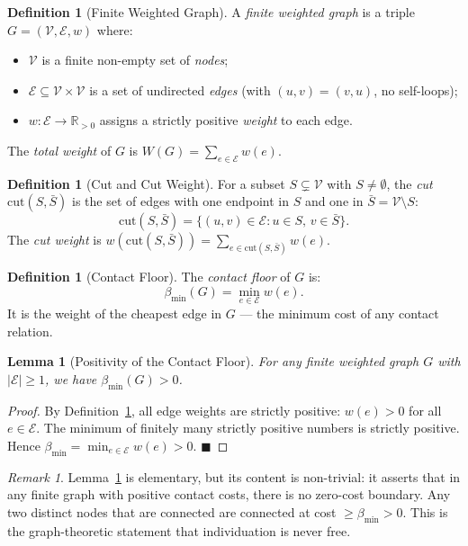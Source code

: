 \documentclass[12pt, a4paper]{article}
\theoremstyle{plain}
\newtheorem{lemma}[theorem]{Lemma}
\theoremstyle{definition}
\newtheorem{definition}[theorem]{Definition}
\theoremstyle{remark}
\newtheorem{remark}[theorem]{Remark}
\newcommand{\cut}{\mathrm{cut}}
\newcommand{\reals}{\mathbb{R}}
\newcommand{\Ecal}{\mathcal{E}}
\newcommand{\Vcal}{\mathcal{V}}
\newcommand{\bmin}{\beta_{\min}}
\newcommand{\qed}{\hfill$\blacksquare$}
\begin{document}
\begin{definition}[Finite Weighted Graph]
\label{def:fwg}
A \emph{finite weighted graph} is a triple $G = (\Vcal, \Ecal, w)$ where:
\begin{itemize}
  \item $\Vcal$ is a finite non-empty set of \emph{nodes};
  \item $\Ecal \subseteq \Vcal \times \Vcal$ is a set of undirected
  \emph{edges} (with $(u,v) = (v,u)$, no self-loops);
  \item $w: \Ecal \to \reals_{> 0}$ assigns a strictly positive \emph{weight}
  to each edge.
\end{itemize}
The \emph{total weight} of $G$ is $W(G) = \sum_{e \in \Ecal} w(e)$.
\end{definition}

\begin{definition}[Cut and Cut Weight]
\label{def:cut}
For a subset $S \subsetneq \Vcal$ with $S \neq \emptyset$, the \emph{cut}
$\cut(S, \bar{S})$ is the set of edges with one endpoint in $S$ and one in
$\bar{S} = \Vcal \setminus S$:
\[
  \cut(S, \bar{S}) = \{(u,v) \in \Ecal : u \in S,\, v \in \bar{S}\}.
\]
The \emph{cut weight} is $w(\cut(S,\bar{S})) = \sum_{e \in \cut(S,\bar{S})} w(e)$.
\end{definition}

\begin{definition}[Contact Floor]
\label{def:floor}
The \emph{contact floor} of $G$ is:
\[
  \bmin(G) = \min_{e \in \Ecal} w(e).
\]
It is the weight of the cheapest edge in $G$ --- the minimum cost of any
contact relation.
\end{definition}

\begin{lemma}[Positivity of the Contact Floor]
\label{lem:floor_positive}
For any finite weighted graph $G$ with $|\Ecal| \geq 1$, we have $\bmin(G) > 0$.
\end{lemma}

\begin{proof}
By Definition~\ref{def:fwg}, all edge weights are strictly positive:
$w(e) > 0$ for all $e \in \Ecal$. The minimum of finitely many strictly
positive numbers is strictly positive. Hence $\bmin = \min_{e \in \Ecal}
w(e) > 0$. \qed
\end{proof}

\begin{remark}
Lemma~\ref{lem:floor_positive} is elementary, but its content is non-trivial:
it asserts that in any finite graph with positive contact costs, there is no
zero-cost boundary. Any two distinct nodes that are connected are connected
at cost $\geq \bmin > 0$. This is the graph-theoretic statement that
individuation is never free.
\end{remark}
\end{document}
